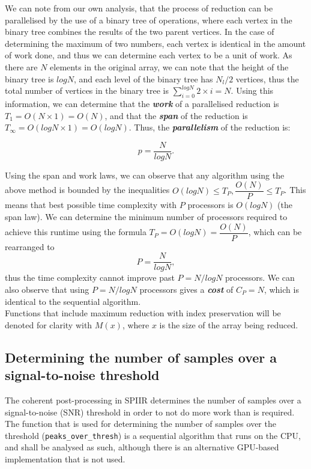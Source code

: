 \documentclass{article}
\begin{document}
We can note from our own analysis, that the process of reduction can be parallelised by the use of a binary tree of operations, where each vertex in the binary tree combines the results of the two parent vertices.
In the case of determining the maximum of two numbers, each vertex is identical in the amount of work done, and thus we can determine each vertex to be a unit of work.
As there are \(N\) elements in the original array, we can note that the height of the binary tree is \(log N\), and each level of the binary tree has \(N_l/2\) vertices, thus the total number of vertices in the binary tree is \(\sum_{i=0}^{log N}{2\times{i}} = N\).
Using this information, we can determine that the \textit{\textbf{work}} of a parallelised reduction is \(T_1 = O(N\times1) = O(N)\), and that the \textit{\textbf{span}} of the reduction is \(T_\infty = O(log N \times {1}) = O(log N)\).
Thus, the \textit{\textbf{parallelism}} of the reduction is:

\[
    p = \dfrac{N}{log N}.
\]

Using the span and work laws, we can observe that any algorithm using the above method is bounded by the inequalities \(O(log N) \leq T_P, \dfrac{O(N)}{P} \leq T_P\).
This means that best possible time complexity with \(P\) processors is \(O(log N)\) (the span law).
We can determine the minimum number of processors required to achieve this runtime using the formula \(T_P = O(log N) = \dfrac{O(N)}{P}\), which can be rearranged to
\[
    P = \dfrac{N}{log N},
\]
thus the time complexity cannot improve past \(P = N/log N\) processors.
We can also observe that using \(P = N/log N\) processors gives a \textit{\textbf{cost}} of \(C_P = N\), which is identical to the sequential algorithm.
\\

Functions that include maximum reduction with index preservation will be denoted for clarity with \(M(x)\), where \(x\) is the size of the array being reduced.

\subsection{Determining the number of samples over a signal-to-noise threshold} \label{sec:peaks}

The coherent post-processing in SPIIR determines the number of samples over a signal-to-noise (SNR) threshold in order to not do more work than is required.
The function that is used for determining the number of samples over the threshold (\texttt{peaks\_over\_thresh}) is a sequential algorithm that runs on the CPU, and shall be analysed as such, although there is an alternative GPU-based implementation that is not used.
\end{document}
